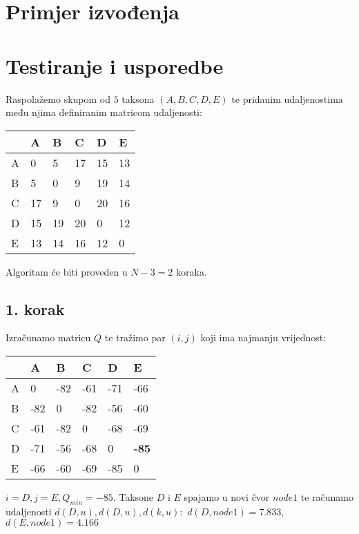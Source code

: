 \documentclass[times, utf8, seminar, numeric]{fer}
\begin{document}
\chapter{Primjer izvođenja}

\chapter{Testiranje i usporedbe}
Raspolažemo skupom od $5$ taksona $(A,B,C,D,E)$ te pridanim udaljenostima među njima definiranim matricom udaljenosti:
\begin{table}[h]
	\centering
    \begin{tabular}{|l|l|l|l|l|l|}
    \hline
    ~ & A  & B  & C  & D  & E  \\ \hline
    A & 0  & 5  & 17 & 15 & 13 \\ \hline
    B & 5  & 0  & 9  & 19 & 14 \\ \hline
    C & 17 & 9  & 0  & 20 & 16 \\ \hline
    D & 15 & 19 & 20 & 0  & 12 \\ \hline
    E & 13 & 14 & 16 & 12 & 0  \\ \hline
    \end{tabular}
\end{table}

Algoritam će biti proveden u $N-3=2$ koraka.

\section{1. korak}
Izračunamo matricu $Q$ te tražimo par $(i,j)$ koji ima najmanju vrijednost:

\begin{table}[h]
	\centering
    \begin{tabular}{|l|l|l|l|l|l|}
    \hline
    ~ & A   & B   & C   & D   & E   \\ \hline
    A & 0   & -82 & -61 & -71 & -66 \\ \hline
    B & -82 & 0   & -82 & -56 & -60 \\ \hline
    C & -61 & -82 & 0   & -68 & -69 \\ \hline
    D & -71 & -56 & -68 & 0   & \textbf{-85} \\ \hline
    E & -66 & -60 & -69 & -85 & 0   \\ \hline
    \end{tabular}
\end{table}

$i = D, j = E, Q_{min} = -85$. Taksone $D$ i $E$ spajamo u novi čvor $node1$ te računamo udaljenosti $d(D,u), d(D,u),d(k,u):$ \newline
\indent $d(D,node1) = 7.833$, \newline
\indent $d(E,node1) = 4.166$
\end{document}
